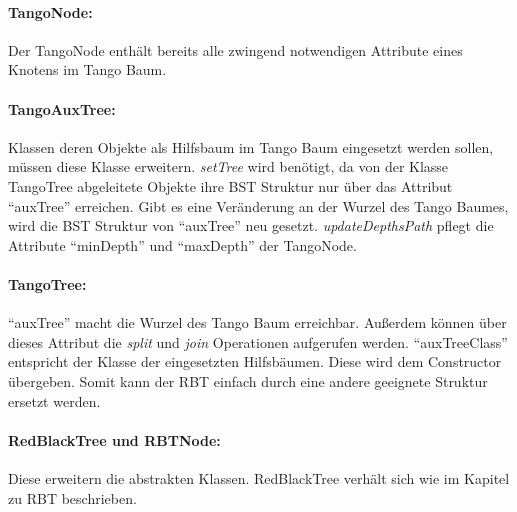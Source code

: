 \documentclass[a4paper,12pt]{article}
\begin{document}
\paragraph{TangoNode:}
Der TangoNode enthält bereits alle zwingend notwendigen Attribute eines Knotens im Tango Baum. 

\paragraph{TangoAuxTree:}
Klassen deren Objekte als Hilfsbaum im Tango Baum eingesetzt werden sollen, müssen diese Klasse erweitern. \textit{setTree} wird benötigt, da von der Klasse TangoTree abgeleitete Objekte ihre BST Struktur nur über das Attribut \enquote{auxTree} erreichen. Gibt es eine Veränderung an der Wurzel des Tango Baumes, wird die BST Struktur von \enquote{auxTree} neu gesetzt. \textit{updateDepthsPath} pflegt die Attribute \enquote{minDepth} und \enquote{maxDepth} der TangoNode.

\paragraph{TangoTree:}
\enquote{auxTree} macht die Wurzel des Tango Baum erreichbar. Außerdem können über dieses Attribut die \textit{split} und \textit{join} Operationen aufgerufen werden. \enquote{auxTreeClass} entspricht der Klasse der eingesetzten Hilfsbäumen. Diese wird dem Constructor übergeben. Somit kann der RBT einfach durch eine andere geeignete Struktur ersetzt werden.

\paragraph{RedBlackTree und RBTNode:}
Diese erweitern die abstrakten Klassen. RedBlackTree verhält sich wie im Kapitel zu RBT beschrieben. 
\end{document}
